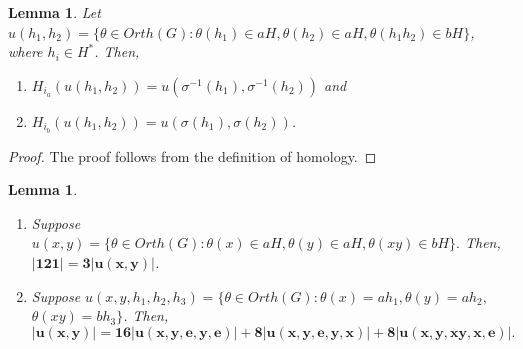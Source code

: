 \documentclass[11pt,a4paper]{article}
\newtheorem{lemma}[theorem]{Lemma}
\theoremstyle{definition}
\theoremstyle{remark}
\begin{document}
	\begin{lemma}\label{le8} Let $u(h_{1},h_{2}) = \{\theta \in Orth(G): \theta(h_{1}) \in aH, \theta(h_{2}) \in aH, \theta(h_{1}h_{2}) \in bH\}$, where $h_{i} \in H^{\ast}$. Then,
		\begin{enumerate}
			\item [(i)] $H_{i_{a}}(u(h_{1},h_{2})) = u(\sigma^{-1}(h_{1}), \sigma^{-1}(h_{2}))$ and
			\item[(ii)] $H_{i_{b}}(u(h_{1},h_{2})) = u(\sigma(h_{1}), \sigma(h_{2}))$.
		\end{enumerate}
	\end{lemma}
	\begin{proof}
		The proof follows from the definition of homology.
	\end{proof}
\begin{lemma}\label{le8}\hfill
	\begin{enumerate}
		\item [(i)]  Suppose $u(x,y) = \{\theta \in Orth(G): \theta(x) \in aH, \theta(y) \in aH, \theta(xy) \in bH\}.$ Then, $\bm{\vert 121 \vert = 3\vert u(x,y) \vert}$.
		
		\item [(ii)] Suppose $u(x,y,h_{1},h_{2},h_{3}) = \{\theta \in Orth(G) : \theta(x) = ah_{1},\theta(y) = ah_{2},$ $ \theta(xy) = bh_{3}\}$. Then,	\[\bm{\vert u(x,y) \vert = 16 \vert u(x,y,e,y,e) \vert + 8 \vert u(x,y,e,y,x) \vert + 8\vert u(x,y,xy,x,e) \vert}.\]
	\end{enumerate}
\end{lemma}
\end{document}
